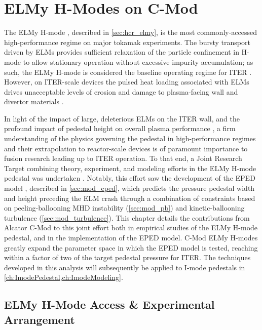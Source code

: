 \chapter{ELMy H-Modes on C-Mod}\label{ch:Elmy}

The ELMy H-mode \cite{Wagner1982,Keilhacker1984}, described in \cref{sec:hcr_elmy}, is the most commonly-accessed high-performance regime on major tokamak experiments.  The bursty transport driven by ELMs provides sufficient relaxation of the particle confinement in H-mode to allow stationary operation without excessive impurity accumulation; as such, the ELMy H-mode is considered the baseline operating regime for ITER \cite{ITER1999,Shimada2007}.  However, on ITER-scale devices the pulsed heat loading associated with ELMs drives unacceptable levels of erosion and damage to plasma-facing wall and divertor materials \cite{Loarte2003,Federici2003}.

In light of the impact of large, deleterious ELMs on the ITER wall, and the profound impact of pedestal height on overall plasma performance \cite{Kinsey2011,Doyle2007}, a firm understanding of the physics governing the pedestal in high-performance regimes and their extrapolation to reactor-scale devices is of paramount importance to fusion research leading up to ITER operation.  To that end, a Joint Research Target combining theory, experiment, and modeling efforts in the ELMy H-mode pedestal was undertaken \cite{Groebner2013,JRT2011}.  Notably, this effort saw the development of the EPED model \cite{Snyder2009,Snyder2011,Snyder2009a}, described in \cref{sec:mod_eped}, which predicts the pressure pedestal width and height preceding the ELM crash through a combination of constraints based on peeling-ballooning MHD instability \cite{Snyder2004,Wilson2002,Wilson2006} (\cref{sec:mod_pb}) and kinetic-ballooning turbulence \cite{Snyder2001} (\cref{sec:mod_turbulence}).  This chapter details the contributions from Alcator C-Mod to this joint effort \cite{Walk2012} both in empirical studies of the ELMy H-mode pedestal, and in the implementation of the EPED model.  C-Mod ELMy H-modes greatly expand the parameter space in which the EPED model is tested, reaching within a factor of two of the target pedestal pressure for ITER.  The techniques developed in this analysis will subsequently be applied to I-mode pedestals in \cref{ch:ImodePedestal,ch:ImodeModeling}.\nicesectionending

\section{ELMy H-Mode Access \& Experimental Arrangement}\label{sec:elmy_access}

